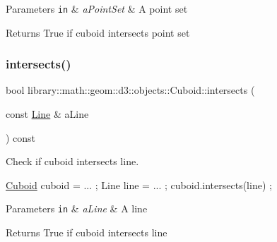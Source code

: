 \begin{DoxyParams}[1]{Parameters}
\mbox{\tt in}  & {\em a\+Point\+Set} & A point set \\
\hline
\end{DoxyParams}
\begin{DoxyReturn}{Returns}
True if cuboid intersects point set 
\end{DoxyReturn}
\mbox{\label{classlibrary_1_1math_1_1geom_1_1d3_1_1objects_1_1_cuboid_a39646697bbc1c0598cf985faad5cd582}} 
\subsubsection{\texorpdfstring{intersects()}{intersects()}\hspace{0.1cm}{\footnotesize\ttfamily [3/9]}}
{\footnotesize\ttfamily bool library\+::math\+::geom\+::d3\+::objects\+::\+Cuboid\+::intersects (\begin{DoxyParamCaption}\item[{const \hyperlink{classlibrary_1_1math_1_1geom_1_1d3_1_1objects_1_1_line}{Line} \&}]{a\+Line }\end{DoxyParamCaption}) const}



Check if cuboid intersects line. 


\begin{DoxyCode}
\hyperlink{classlibrary_1_1math_1_1geom_1_1d3_1_1objects_1_1_cuboid_ac42299f962fab284a76a46d4ea4e6fa2}{Cuboid} cuboid = ... ;
Line line = ... ;
cuboid.intersects(line) ;
\end{DoxyCode}



\begin{DoxyParams}[1]{Parameters}
\mbox{\tt in}  & {\em a\+Line} & A line \\
\hline
\end{DoxyParams}
\begin{DoxyReturn}{Returns}
True if cuboid intersects line 
\end{DoxyReturn}
\mbox{\label{classlibrary_1_1math_1_1geom_1_1d3_1_1objects_1_1_cuboid_a1faf168d7d2f4879c27bc4723da03aa4}} 
